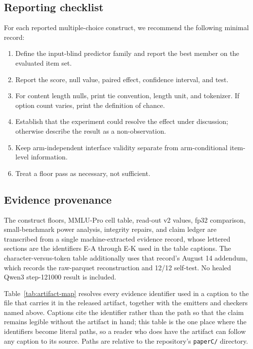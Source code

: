 

\FloatBarrier

\subsection{Reporting checklist}

For each reported multiple-choice construct, we recommend the following minimal record:
\begin{enumerate}[leftmargin=*]
    \item Define the input-blind predictor family and report the best member on the evaluated item set.
    \item Report the score, null value, paired effect, confidence interval, and test.
    \item For content length nulls, print tie convention, length unit, and tokenizer. If option count varies, print the definition of chance.
    \item Establish that the experiment could resolve the effect under discussion; otherwise describe the result as a non-observation.
    \item Keep arm-independent interface validity separate from arm-conditional item-level information.
    \item Treat a floor pass as necessary, not sufficient.
\end{enumerate}

\subsection{Evidence provenance}
\label{app:provenance}

The construct floors, MMLU-Pro cell table, read-out v2 values, fp32 comparison, small-benchmark power analysis, integrity repairs, and claim ledger are transcribed from a single machine-extracted evidence record, whose lettered sections are the identifiers \textsf{E-A} through \textsf{E-K} used in the table captions. The character-versus-token table additionally uses that record's August 14 addendum, which records the raw-parquet reconstruction and 12/12 self-test. No healed Qwen3 step-121000 result is included.

Table~\ref{tab:artifact-map} resolves every evidence identifier used in a caption to the
file that carries it in the released artifact, together with the emitters and checkers named
above. Captions cite the identifier rather than the path so that the claim remains legible
without the artifact in hand; this table is the one place where the identifiers become
literal paths, so a reader who does have the artifact can follow any caption to its source.
Paths are relative to the repository's \texttt{paperC/} directory.

